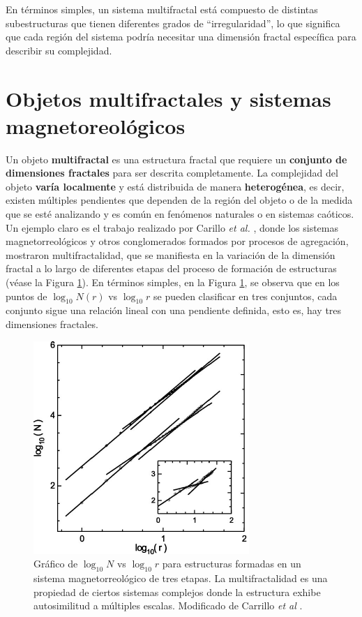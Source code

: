 En t\'{e}rminos simples, un sistema multifractal est\'{a} compuesto de distintas subestructuras que tienen diferentes grados de ``irregularidad'', lo que significa que cada regi\'{o}n del sistema podr\'{i}a necesitar una dimensi\'{o}n fractal espec\'{i}fica para describir su complejidad.

\section*{Objetos multifractales y sistemas magnetoreol\'{o}gicos}

Un objeto \textbf{multifractal} es una estructura fractal que requiere un \textbf{conjunto de dimensiones fractales} para ser descrita completamente. La complejidad del objeto \textbf{var\'{i}a localmente} y est\'{a} distribuida de manera \textbf{heterog\'{e}nea}, es decir, existen m\'{u}ltiples pendientes que dependen de la regi\'{o}n del objeto o de la medida que se est\'{e} analizando y es com\'{u}n en fen\'{o}menos naturales o en sistemas ca\'{o}ticos. Un ejemplo claro es el trabajo realizado por Carillo \textit{et al.} \cite{Carrillo2003}, donde los sistemas 
magnetorreol\'{o}gicos y otros conglomerados formados por procesos de agregaci\'{o}n, mostraron multifractalidad, que se manifiesta en la variaci\'{o}n de la dimensi\'{o}n fractal a lo largo de diferentes etapas del proceso de formaci\'{o}n 
de estructuras (v\'{e}ase la Figura \ref{fig:Carrillo-Fractal}). En t\'{e}rminos simples, en la Figura \ref{fig:Carrillo-Fractal}, se observa que en los puntos de $\log_{10}N(r)$ vs $\log_{10}r$ se pueden clasificar en tres conjuntos, cada conjunto sigue una relaci\'{o}n lineal con una pendiente definida, esto es, hay tres dimensiones fractales.


\begin{figure}[H]
	\begin{center}
		\includegraphics[width=0.4\linewidth]{graphs/Carrillo2003}
		\caption{Gr\'{a}fico de $\log_{10}N$ vs $\log_{10}r$ para estructuras formadas en un sistema magnetorreol\'{o}gico de tres etapas. La multifractalidad es una propiedad de ciertos sistemas complejos donde la estructura exhibe autosimilitud a m\'{u}ltiples  escalas. Modificado de Carrillo \textit{et al} \cite{Carrillo2003}.}
		\label{fig:Carrillo-Fractal}
	\end{center}
\end{figure}

